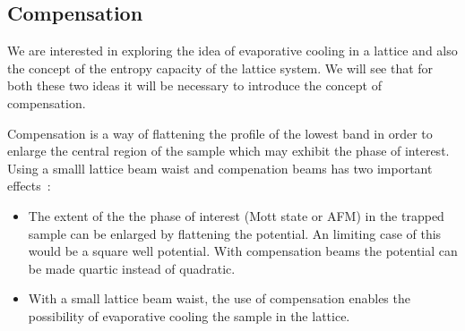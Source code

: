\documentclass[11pt,letter]{article}
\begin{document}


\subsection{Compensation}
\label{subsec:compensation}


We are interested in exploring the idea of evaporative cooling in a lattice and
also the concept of the entropy capacity of the lattice system.  We will see
that for both these two ideas it will be necessary to introduce the concept of
compensation.  

Compensation is a way of flattening the profile of the lowest band in order to
enlarge the central region of the sample which may exhibit the phase of
interest.   Using a smalll lattice beam waist and compenation beams has two
important effects~\cite{Mathy2012}:
\begin{itemize}
\item  The extent of the the phase of interest (Mott state or AFM) in the
trapped sample can be enlarged by flattening the potential.   An limiting case
of this would be a square well potential.  With compensation beams the
potential can be made quartic instead of quadratic.  
\item  With a small lattice beam waist, the use of compensation enables the
possibility of evaporative cooling the sample in the lattice.  
\end{itemize} 
\end{document}

